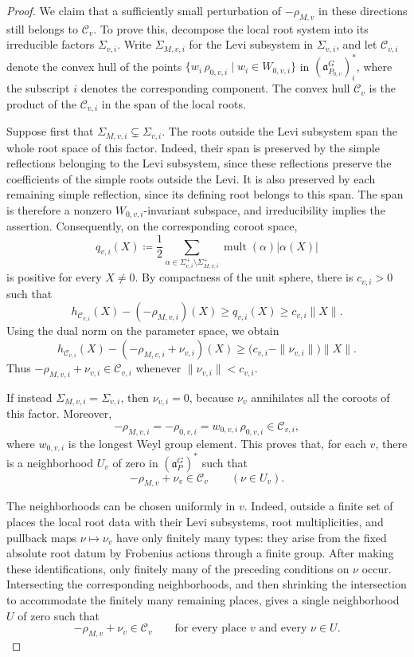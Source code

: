 \documentclass[12pt]{amsart}
\theoremstyle{definition}
\theoremstyle{plain}
\theoremstyle{remark}
\newcommand{\fa}{\mathfrak{a}}
\numberwithin{equation}{section}
\newcommand{\sC}{\mathscr{C}}
\begin{document}
\begin{proof}
We claim that a sufficiently small perturbation of
$-\rho_{M,v}$ in these directions still belongs to $\sC_v$.
To prove this, decompose the local root system into its
irreducible factors $\Sigma_{v,i}$.
Write $\Sigma_{M,v,i}$ for the Levi subsystem in $\Sigma_{v,i}$, and let $\sC_{v,i}$ denote the convex hull of the points $\{w_i\, \rho_{0,v,i} \mid w_i\in W_{0,v,i}\}$ in $(\fa_{P_{0,v}}^G)^*_i$, 
where the subscript $i$ denotes the corresponding component.
The convex hull $\sC_v$ is the product of the $\sC_{v,i}$ in the span of the local roots.

Suppose first that $\Sigma_{M,v,i}\subsetneq\Sigma_{v,i}$.
The roots outside the Levi subsystem span the whole root
space of this factor.
Indeed, their span is preserved by the simple reflections
belonging to the Levi subsystem, since these reflections
preserve the coefficients of the simple roots outside the Levi.
It is also preserved by each remaining simple reflection,
since its defining root belongs to this span.
The span is therefore a nonzero $W_{0,v,i}$-invariant
subspace, and irreducibility implies the assertion.
Consequently, on the corresponding coroot space,
\[
 q_{v,i}(X)
 \coloneqq
 \frac12
 \sum_{\alpha\in\Sigma_{v,i}^{+}
                    \setminus\Sigma_{M,v,i}^{+}}
       \operatorname{mult}(\alpha)|\alpha(X)|
\]
is positive for every $X\ne0$.
By compactness of the unit sphere, there is $c_{v,i}>0$ such that
\[
 h_{\sC_{v,i}}(X)-(-\rho_{M,v,i})(X)
 \ge q_{v,i}(X)
 \ge c_{v,i}\|X\|.
\]
Using the dual norm on the parameter space, we obtain
\[
 h_{\sC_{v,i}}(X)
       -(-\rho_{M,v,i}+\nu_{v,i})(X)
 \ge
 \bigl(c_{v,i}-\|\nu_{v,i}\|\bigr)\|X\|.
\]
Thus $-\rho_{M,v,i}+\nu_{v,i}\in\sC_{v,i}$ whenever $\|\nu_{v,i}\|<c_{v,i}$.


If instead $\Sigma_{M,v,i}=\Sigma_{v,i}$, then
$\nu_{v,i}=0$, because $\nu_v$ annihilates all the
coroots of this factor.
Moreover,
\[
 -\rho_{M,v,i}
 =-\rho_{0,v,i}
 =w_{0,v,i}\, \rho_{0,v,i}\in\sC_{v,i},
\]
where $w_{0,v,i}$ is the longest Weyl group element.
This proves that, for each $v$, there is a neighborhood $U_v$ of zero in $(\fa_P^G)^*$ such that
\[
 -\rho_{M,v}+\nu_v\in\sC_v
 \qquad(\nu\in U_v).
\]

The neighborhoods can be chosen uniformly in $v$.
Indeed, outside a finite set of places the local root data
with their Levi subsystems, root multiplicities, and
pullback maps $\nu\mapsto\nu_v$ have only finitely many
types: they arise from the fixed absolute root datum
by Frobenius actions through a finite group.
After making these identifications, only finitely many
of the preceding conditions on $\nu$ occur.
Intersecting the corresponding neighborhoods, and then
shrinking the intersection to accommodate the finitely
many remaining places, gives a single neighborhood $U$ of zero such that
\[
 -\rho_{M,v}+\nu_v\in\sC_v
 \qquad\text{for every place $v$ and every $\nu\in U$}.
\]



\end{proof}
\end{document}
